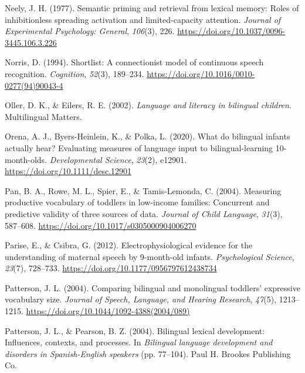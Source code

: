 \documentclass[
  12pt,
  b5paperpaper,
  twoside]{scrreprt}
\newlength{\cslhangindent}
\newlength{\cslentryspacingunit} %
\newenvironment{CSLReferences}[2] %
 {%
  \setlength{\parindent}{0pt}
  \ifodd #1
  \let\oldpar\par
  \def\par{\hangindent=\cslhangindent\oldpar}
  \fi
  \setlength{\parskip}{#2\cslentryspacingunit}
 }%
 {}
\begin{document}
\begin{CSLReferences}{1}{0}
\leavevmode{}%
Neely, J. H. (1977). Semantic priming and retrieval from lexical memory:
Roles of inhibitionless spreading activation and limited-capacity
attention. \emph{Journal of Experimental Psychology: General},
\emph{106}(3), 226. \url{https://doi.org/10.1037/0096-3445.106.3.226}

\leavevmode{}%
Norris, D. (1994). Shortlist: A connectionist model of continuous speech
recognition. \emph{Cognition}, \emph{52}(3), 189--234.
\url{https://doi.org/10.1016/0010-0277(94)90043-4}

\leavevmode{}%
Oller, D. K., \& Eilers, R. E. (2002). \emph{Language and literacy in
bilingual children}. {Multilingual Matters}.

\leavevmode{}%
Orena, A. J., Byers-Heinlein, K., \& Polka, L. (2020). What do bilingual
infants actually hear? {Evaluating} measures of language input to
bilingual-learning 10-month-olds. \emph{Developmental Science},
\emph{23}(2), e12901. \url{https://doi.org/10.1111/desc.12901}

\leavevmode{}%
Pan, B. A., Rowe, M. L., Spier, E., \& Tamis-Lemonda, C. (2004).
Measuring productive vocabulary of toddlers in low-income families:
Concurrent and predictive validity of three sources of data.
\emph{Journal of Child Language}, \emph{31}(3), 587--608.
\url{https://doi.org/10.1017/s0305000904006270}

\leavevmode{}%
Parise, E., \& Csibra, G. (2012). Electrophysiological evidence for the
understanding of maternal speech by 9-month-old infants.
\emph{Psychological Science}, \emph{23}(7), 728--733.
\url{https://doi.org/10.1177/0956797612438734}

\leavevmode{}%
Patterson, J. L. (2004). Comparing bilingual and monolingual toddlers'
expressive vocabulary size. \emph{Journal of Speech, Language, and
Hearing Research}, \emph{47}(5), 1213--1215.
\url{https://doi.org/10.1044/1092-4388(2004/089)}

\leavevmode{}%
Patterson, J. L., \& Pearson, B. Z. (2004). Bilingual lexical
development: Influences, contexts, and processes. In \emph{Bilingual
language development and disorders in {Spanish-English} speakers} (pp.
77--104). {Paul H. Brookes Publishing Co.}


\end{CSLReferences}
\end{document}
